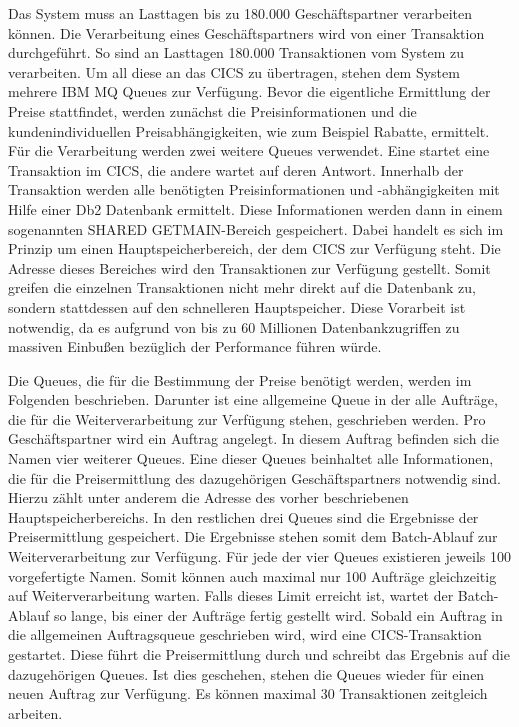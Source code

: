 Das System muss an Lasttagen bis zu 180.000 Geschäftspartner verarbeiten können.
Die Verarbeitung eines Geschäftspartners wird von einer Transaktion durchgeführt.
So sind an Lasttagen 180.000 Transaktionen vom System zu verarbeiten.
Um all diese an das CICS zu übertragen, stehen dem System mehrere IBM MQ Queues zur Verfügung.
Bevor die eigentliche Ermittlung der Preise stattfindet, werden zunächst die Preisinformationen und die kundenindividuellen Preisabhängigkeiten, wie zum Beispiel Rabatte, ermittelt.
Für die Verarbeitung werden zwei weitere Queues verwendet.
Eine startet eine Transaktion im CICS, die andere wartet auf deren Antwort.
Innerhalb der Transaktion werden alle benötigten Preisinformationen und -abhängigkeiten mit Hilfe einer Db2 Datenbank ermittelt.
Diese Informationen werden dann in einem sogenannten \glqq SHARED GETMAIN\grqq-Bereich gespeichert.
Dabei handelt es sich im Prinzip um einen Hauptspeicherbereich, der dem CICS zur Verfügung steht.
Die Adresse dieses Bereiches wird den Transaktionen zur Verfügung gestellt.
Somit greifen die einzelnen Transaktionen nicht mehr direkt auf die Datenbank zu, sondern stattdessen auf den schnelleren Hauptspeicher.
Diese Vorarbeit ist notwendig, da es aufgrund von bis zu 60 Millionen Datenbankzugriffen zu massiven Einbußen bezüglich der Performance führen würde.

Die Queues, die für die Bestimmung der Preise benötigt werden, werden im Folgenden beschrieben.
Darunter ist eine allgemeine Queue in der alle Aufträge, die für die Weiterverarbeitung zur Verfügung stehen, geschrieben werden.
Pro Geschäftspartner wird ein Auftrag angelegt.
In diesem Auftrag befinden sich die Namen vier weiterer Queues.
Eine dieser Queues beinhaltet alle Informationen, die für die Preisermittlung des dazugehörigen Geschäftspartners notwendig sind.
Hierzu zählt unter anderem die Adresse des vorher beschriebenen Hauptspeicherbereichs.
In den restlichen drei Queues sind die Ergebnisse der Preisermittlung gespeichert.
Die Ergebnisse stehen somit dem Batch-Ablauf zur Weiterverarbeitung zur Verfügung.
Für jede der vier Queues existieren jeweils 100 vorgefertigte Namen.
Somit können auch maximal nur 100 Aufträge gleichzeitig auf Weiterverarbeitung warten.
Falls dieses Limit erreicht ist, wartet der Batch-Ablauf so lange, bis einer der Aufträge fertig gestellt wird.
Sobald ein Auftrag in die allgemeinen Auftragsqueue geschrieben wird, wird eine CICS-Transaktion gestartet.
Diese führt die Preisermittlung durch und schreibt das Ergebnis auf die dazugehörigen Queues.
Ist dies geschehen, stehen die Queues wieder für einen neuen Auftrag zur Verfügung.
Es können maximal 30 Transaktionen zeitgleich arbeiten.

